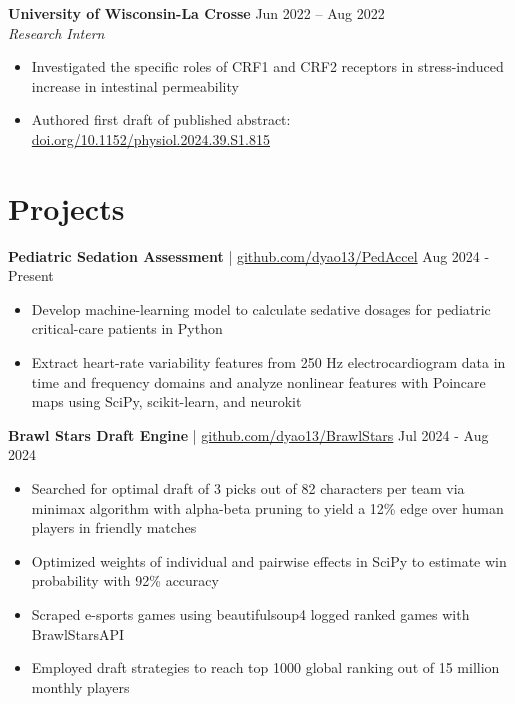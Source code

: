 \documentclass[11pt]{article}       %
\begin{document}
\textbf{University of Wisconsin-La Crosse} \hfill Jun 2022 – Aug 2022 \\
\textit{Research Intern} \vspace{-9pt} \\
\begin{itemize}
  \item Investigated the specific roles of CRF1 and CRF2 receptors in stress-induced increase in intestinal permeability
  \item Authored first draft of published abstract: \href{https://doi.org/10.1152/physiol.2024.39.S1.815}{doi.org/10.1152/physiol.2024.39.S1.815}
\end{itemize}

\vspace{-18.5pt}

\section*{Projects}
\textbf{Pediatric Sedation Assessment} | \href{https://github.com/dyao13/PedAccel}{github.com/dyao13/PedAccel} \hfill Aug 2024 - Present \vspace{-9pt} \\
\begin{itemize}
  \item Develop machine-learning model to calculate sedative dosages for pediatric critical-care patients in Python
  \item Extract heart-rate variability features from 250 Hz electrocardiogram data in time and frequency domains and analyze nonlinear features with Poincare maps using SciPy, scikit-learn, and neurokit
\end{itemize}

\textbf{Brawl Stars Draft Engine} | \href{https://github.com/dyao13/BrawlStars}{github.com/dyao13/BrawlStars} \hfill Jul 2024 - Aug 2024 \vspace{-9pt} \\
\begin{itemize}
  \item Searched for optimal draft of 3 picks out of 82 characters per team via minimax algorithm with alpha-beta pruning to yield a 12\% edge over human players in friendly matches
  \item Optimized weights of individual and pairwise effects in SciPy to estimate win probability with 92\% accuracy
  \item Scraped e-sports games using beautifulsoup4 logged ranked games with BrawlStarsAPI
  \item Employed draft strategies to reach top 1000 global ranking out of 15 million monthly players
\end{itemize}
\end{document}
